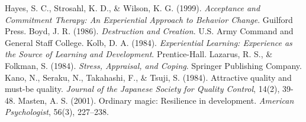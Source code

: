 \documentclass{article}
\begin{document}
\begin{thebibliography}{99}
     Hayes, S. C., Strosahl, K. D., \& Wilson, K. G. (1999). \textit{Acceptance and Commitment Therapy: An Experiential Approach to Behavior Change}. Guilford Press.
     Boyd, J. R. (1986). \textit{Destruction and Creation}. U.S. Army Command and General Staff College.
     Kolb, D. A. (1984). \textit{Experiential Learning: Experience as the Source of Learning and Development}. Prentice-Hall.
     Lazarus, R. S., \& Folkman, S. (1984). \textit{Stress, Appraisal, and Coping}. Springer Publishing Company.
     Kano, N., Seraku, N., Takahashi, F., \& Tsuji, S. (1984). Attractive quality and must-be quality. \textit{Journal of the Japanese Society for Quality Control}, 14(2), 39-48.
     Masten, A. S. (2001). Ordinary magic: Resilience in development. \textit{American Psychologist}, 56(3), 227–238.
\end{thebibliography}
\end{document}
